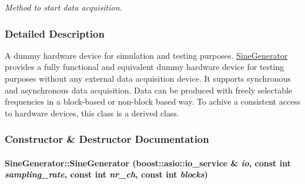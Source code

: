 \begin{DoxyCompactItemize}
\begin{DoxyCompactList}\small\item\em Method to start data acquisition. \item\end{DoxyCompactList}\end{DoxyCompactItemize}


\subsubsection{Detailed Description}
A dummy hardware device for simulation and testing purposes. \hyperlink{class_sine_generator}{SineGenerator} provides a fully functional and equivalent dummy hardware device for testing purposes without any external data acquisition device. It supports synchronous and asynchronous data acquisition. Data can be produced with freely selectable frequencies in a block-\/based or non-\/block based way. To achive a consistent access to hardware devices, this class is a derived class. 

\subsubsection{Constructor \& Destructor Documentation}
\hypertarget{class_sine_generator_aab92800ac3de55e4b9235c47a769650a}{
\paragraph[{SineGenerator}]{\setlength{\rightskip}{0pt plus 5cm}SineGenerator::SineGenerator (boost::asio::io\_\-service \& {\em io}, \/  const int {\em sampling\_\-rate}, \/  const int {\em nr\_\-ch}, \/  const int {\em blocks})}\hfill}
\label{class_sine_generator_aab92800ac3de55e4b9235c47a769650a}


